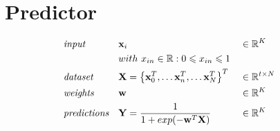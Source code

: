 \documentclass[a4paper]{article}
\begin{document}
\section*{Predictor}

\begin{align}
	&\emph{input} && \mathbf{x}_i &&\in\mathbb{R}^K\nonumber\\
	&&&with\ x_{in}\in\mathbb{R}: 0\leqslant x_{in}\leqslant 1  &&\,&&\nonumber\\
	&\emph{dataset} &&\mathbf{X}=\left\{\mathbf{x}^T_0,\dots\mathbf{x}^T_n,\dots\mathbf{x}^T_N\right\}^T &&\in\mathbb{R}^{t\times N} \nonumber\\
	&\emph{weights} && \mathbf{w} &&\in\mathbb{R}^{K} \nonumber\\
	&\emph{predictions} && \mathbf{Y} = \frac{1}{1 + exp(-\mathbf{w}^T\mathbf{X})}&&\in\mathbb{R}^{K} \nonumber
\end{align}
\end{document}
